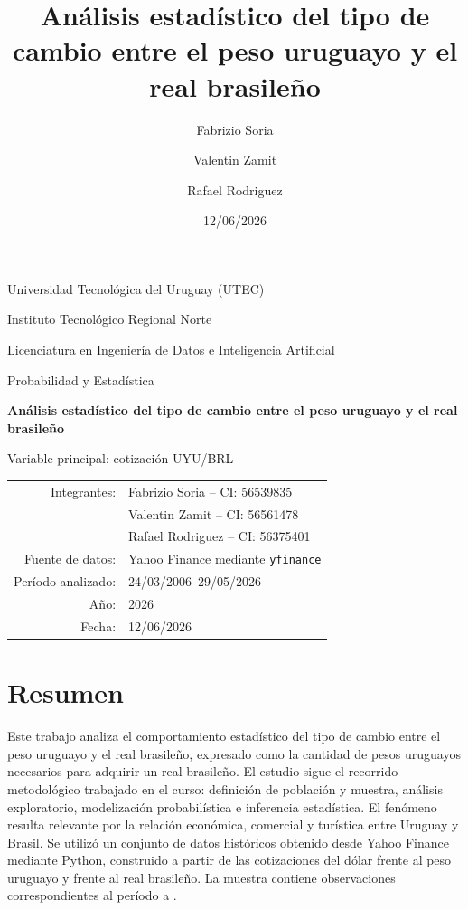 \documentclass[12pt,a4paper]{article}
\title{Análisis estadístico del tipo de cambio entre el peso uruguayo y el real brasileño}
\author{Fabrizio Soria \and Valentin Zamit \and Rafael Rodriguez}
\date{12/06/2026}
\begin{document}
\begin{titlepage}
    \centering
    {\Large Universidad Tecnológica del Uruguay (UTEC)\par}
    \vspace{0.12cm}
    {\large Instituto Tecnológico Regional Norte\par}
    \vspace{0.12cm}
    {\large Licenciatura en Ingeniería de Datos e Inteligencia Artificial\par}
    \vspace{1cm}
    {\Large Probabilidad y Estadística\par}
    \vspace{0.9cm}
    {\huge\bfseries Análisis estadístico del tipo de cambio entre el peso uruguayo y el real brasileño\par}
    \vspace{0.85cm}
    {\large Variable principal: cotización UYU/BRL\par}
    \vspace{0.85cm}
    \begin{tabular}{rl}
        Integrantes: & Fabrizio Soria -- CI: 56539835 \\
                     & Valentin Zamit -- CI: 56561478 \\
                     & Rafael Rodriguez -- CI: 56375401 \\
        Fuente de datos: & Yahoo Finance mediante \texttt{yfinance} \\
        Período analizado: & 24/03/2006--29/05/2026 \\
        Año: & 2026 \\
        Fecha: & 12/06/2026
    \end{tabular}
\end{titlepage}

\tableofcontents
\newpage

\section*{Resumen}
Este trabajo analiza el comportamiento estadístico del tipo de cambio entre el peso uruguayo y el real brasileño, expresado como la cantidad de pesos uruguayos necesarios para adquirir un real brasileño. El estudio sigue el recorrido metodológico trabajado en el curso: definición de población y muestra, análisis exploratorio, modelización probabilística e inferencia estadística. El fenómeno resulta relevante por la relación económica, comercial y turística entre Uruguay y Brasil. Se utilizó un conjunto de datos históricos obtenido desde Yahoo Finance mediante Python, construido a partir de las cotizaciones del dólar frente al peso uruguayo y frente al real brasileño. La muestra contiene \TotalRegistros{} observaciones correspondientes al período \FechaMinima{} a \FechaMaxima{}.
\end{document}
